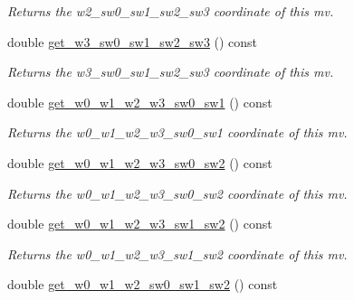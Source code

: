 \begin{DoxyCompactItemize}
\begin{DoxyCompactList}\small\item\em Returns the w2\-\_\-sw0\-\_\-sw1\-\_\-sw2\-\_\-sw3 coordinate of this mv. \end{DoxyCompactList}\item 
\hypertarget{classe3ga_1_1mv_a33df0d137918c431d59304631d6b82d1}{double \hyperlink{classe3ga_1_1mv_a33df0d137918c431d59304631d6b82d1}{get\-\_\-w3\-\_\-sw0\-\_\-sw1\-\_\-sw2\-\_\-sw3} () const }\label{classe3ga_1_1mv_a33df0d137918c431d59304631d6b82d1}

\begin{DoxyCompactList}\small\item\em Returns the w3\-\_\-sw0\-\_\-sw1\-\_\-sw2\-\_\-sw3 coordinate of this mv. \end{DoxyCompactList}\item 
\hypertarget{classe3ga_1_1mv_a88fada41a6ab9a8c8b7504e06872e89e}{double \hyperlink{classe3ga_1_1mv_a88fada41a6ab9a8c8b7504e06872e89e}{get\-\_\-w0\-\_\-w1\-\_\-w2\-\_\-w3\-\_\-sw0\-\_\-sw1} () const }\label{classe3ga_1_1mv_a88fada41a6ab9a8c8b7504e06872e89e}

\begin{DoxyCompactList}\small\item\em Returns the w0\-\_\-w1\-\_\-w2\-\_\-w3\-\_\-sw0\-\_\-sw1 coordinate of this mv. \end{DoxyCompactList}\item 
\hypertarget{classe3ga_1_1mv_aa3de4de981381fad5aa75ef260b34b54}{double \hyperlink{classe3ga_1_1mv_aa3de4de981381fad5aa75ef260b34b54}{get\-\_\-w0\-\_\-w1\-\_\-w2\-\_\-w3\-\_\-sw0\-\_\-sw2} () const }\label{classe3ga_1_1mv_aa3de4de981381fad5aa75ef260b34b54}

\begin{DoxyCompactList}\small\item\em Returns the w0\-\_\-w1\-\_\-w2\-\_\-w3\-\_\-sw0\-\_\-sw2 coordinate of this mv. \end{DoxyCompactList}\item 
\hypertarget{classe3ga_1_1mv_a447172f6020c345ec25c9f7db2b55bb5}{double \hyperlink{classe3ga_1_1mv_a447172f6020c345ec25c9f7db2b55bb5}{get\-\_\-w0\-\_\-w1\-\_\-w2\-\_\-w3\-\_\-sw1\-\_\-sw2} () const }\label{classe3ga_1_1mv_a447172f6020c345ec25c9f7db2b55bb5}

\begin{DoxyCompactList}\small\item\em Returns the w0\-\_\-w1\-\_\-w2\-\_\-w3\-\_\-sw1\-\_\-sw2 coordinate of this mv. \end{DoxyCompactList}\item 
\hypertarget{classe3ga_1_1mv_a1cc72aa2cbf1570abc82f880f22fd148}{double \hyperlink{classe3ga_1_1mv_a1cc72aa2cbf1570abc82f880f22fd148}{get\-\_\-w0\-\_\-w1\-\_\-w2\-\_\-sw0\-\_\-sw1\-\_\-sw2} () const }\label{classe3ga_1_1mv_a1cc72aa2cbf1570abc82f880f22fd148}


\end{DoxyCompactItemize}
